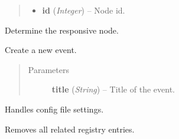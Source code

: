 \documentclass[letterpaper,10pt,english]{sphinxmanual}
\begin{document}
\begin{fulllineitems}
\begin{fulllineitems}
\begin{quote}
\begin{description}
\begin{itemize}
\item {} 
\textbf{id} (\emph{Integer}) -- Node id.

\end{itemize}

\end{description}\end{quote}

\end{fulllineitems}


\begin{fulllineitems}
\label{threads:threads.worker.WORKER_THREAD.check_responsive}
Determine the responsive node.

\end{fulllineitems}


\begin{fulllineitems}
\label{threads:threads.worker.WORKER_THREAD.create_event}
Create a new event.
\begin{quote}\begin{description}
\item[{Parameters}] \leavevmode
\textbf{title} (\emph{String}) -- Title of the event.

\end{description}\end{quote}

\end{fulllineitems}


\begin{fulllineitems}
\label{threads:threads.worker.WORKER_THREAD.parse_config}
Handles config file settings.

\end{fulllineitems}


\begin{fulllineitems}
\label{threads:threads.worker.WORKER_THREAD.remove_all_registry_entries}
Removes all related registry entries.


\end{fulllineitems}
\end{fulllineitems}
\end{document}

